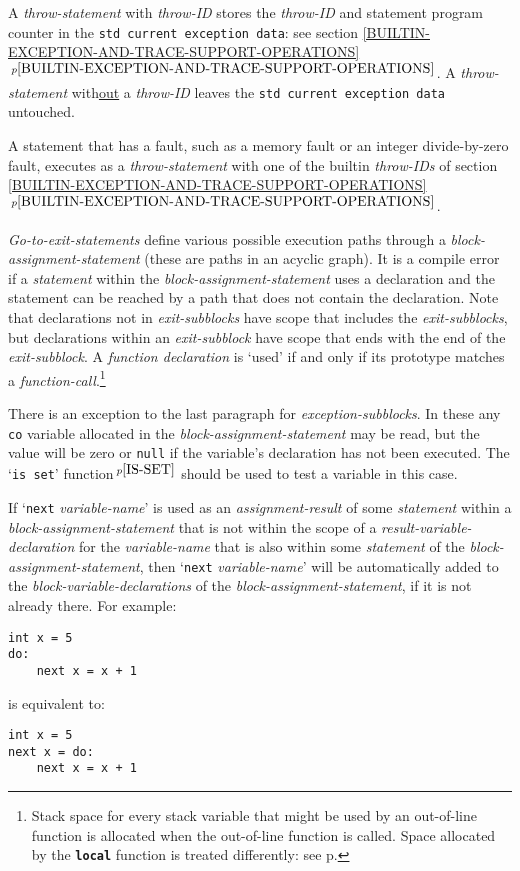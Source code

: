 \documentclass[12pt]{article}
\newcommand{\TT}[1]{{\tt \bfseries #1}}
\newcommand{\itemref}[1]{\ref{#1}$\,^{p\pageref{#1}}$}
\newcommand{\pagref}[1]{p\pageref{#1}}
\newcommand{\pagnote}[1]{$\,^{p\pageref{#1}}$}
\newenvironment{indpar}[1][0.3in]%
	{\begin{list}{}%
		     {\setlength{\itemsep}{0in}%
		      \setlength{\topsep}{0in}%
		      \setlength{\parsep}{1ex}%
		      \setlength{\labelwidth}{#1}%
		      \setlength{\leftmargin}{#1}%
		      \addtolength{\leftmargin}{\labelsep}}%
	 \item}%
	{\end{list}}
\begin{document}
A {\em throw-statement} with {\em throw-ID} stores the {\em throw-ID}
and statement program counter in the {\tt std current exception data}:
see section \itemref{BUILTIN-EXCEPTION-AND-TRACE-SUPPORT-OPERATIONS}.
A {\em throw-statement} with\underline{out} a {\em throw-ID}
leaves the {\tt std current exception data} untouched.

A statement that has a fault,
such as a memory fault or an integer divide-by-zero fault,
executes as a {\em throw-statement} with one of the builtin {\em throw-IDs}
of section \itemref{BUILTIN-EXCEPTION-AND-TRACE-SUPPORT-OPERATIONS}.

{\em Go-to-exit-statements} define various possible execution
paths through a {\em block-assignment-statement}
(these are paths in an acyclic graph).
It is a compile error if a {\em statement}
within the {\em block-assignment-statement}
uses a declaration and the statement can be reached by a path that
does not contain the declaration.
Note that declarations not in {\em exit-subblocks} have scope
that includes the {\em exit-subblocks}, but declarations
within an {\em exit-subblock} have scope that ends with the end of
the {\em exit-subblock}.  A {\em function declaration}
is `used' if and only if its
prototype matches a {\em function-call}.\footnote{Stack space for every
stack variable that might be used by an out-of-line function is
allocated when the out-of-line function is called.  Space allocated
by the \TT{local} function is treated differently:  see
\pagref{OUT-OF-LINE-LOCALS}.}

There is an exception to the last paragraph for {\em exception-subblocks}.
In these any {\tt co} variable allocated in the
{\em block-assignment-statement} may be read, but the value will
be zero or {\tt null} if the variable's declaration has not been
executed.  The `{\tt is set}' function\pagnote{IS-SET} should be
used to test a variable in this case.

If\label{BLOCK-NEXT-PROMOTION} `{\tt next} {\em variable-name}' is used as an
{\em assignment-result} of some {\em statement} within a
{\em block-assignment-statement} that is not within the scope of
a {\em result-variable-declaration} for the {\em variable-name}
that is also within some {\em statement} of the
{\em block-assignment-statement},
then `{\tt next} {\em variable-name}' will be automatically added
to the {\em block-variable-declarations}
of the {\em block-assignment-state\-ment},
if it is not already there.  For example:
\begin{indpar}\begin{verbatim}
int x = 5
do:
    next x = x + 1
\end{verbatim}\end{indpar}
is equivalent to:
\begin{indpar}\begin{verbatim}
int x = 5
next x = do:
    next x = x + 1
\end{verbatim}\end{indpar}
\end{document}
